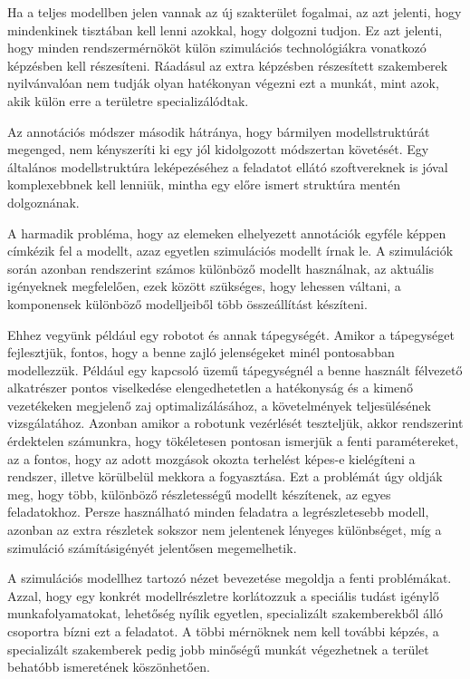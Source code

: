         Ha a teljes modellben jelen vannak az új szakterület fogalmai, az azt jelenti, hogy mindenkinek tisztában kell lenni azokkal, hogy dolgozni tudjon.
        Ez azt jelenti, hogy minden rendszermérnököt külön szimulációs technológiákra vonatkozó képzésben kell részesíteni.
        Ráadásul az extra képzésben részesített szakemberek nyilvánvalóan nem tudják olyan hatékonyan végezni ezt a munkát, mint azok, akik külön erre a területre specializálódtak.

        Az annotációs módszer második hátránya, hogy bármilyen modellstruktúrát megenged, nem kényszeríti ki egy jól kidolgozott módszertan követését.
        Egy általános modellstruktúra leképezéséhez a feladatot ellátó szoftvereknek is jóval komplexebbnek kell lenniük, mintha egy előre ismert struktúra mentén dolgoznának.

        A harmadik probléma, hogy az elemeken elhelyezett annotációk egyféle képpen címkézik fel a modellt, azaz egyetlen szimulációs modellt írnak le.
        A szimulációk során azonban rendszerint számos különböző modellt használnak, az aktuális igényeknek megfelelően, ezek között szükséges, hogy lehessen váltani, a komponensek különböző modelljeiből több összeállítást készíteni.
        
        Ehhez vegyünk például egy robotot és annak tápegységét.
        Amikor a tápegységet fejlesztjük, fontos, hogy a benne zajló jelenségeket minél pontosabban modellezzük. Például egy kapcsoló üzemű tápegységnél a benne használt félvezető alkatrészer pontos viselkedése elengedhetetlen a hatékonyság és a kimenő vezetékeken megjelenő zaj optimalizálásához, a követelmények teljesülésének vizsgálatához.
        Azonban amikor a robotunk vezérlését teszteljük, akkor rendszerint érdektelen számunkra, hogy tökéletesen pontosan ismerjük a fenti paramétereket, az a fontos, hogy az adott mozgások okozta terhelést képes-e kielégíteni a rendszer, illetve körülbelül mekkora a fogyasztása.
        Ezt a problémát úgy oldják meg, hogy több, különböző részletességű modellt készítenek, az egyes feladatokhoz.
        Persze használható minden feladatra a legrészletesebb modell, azonban az extra részletek sokszor nem jelentenek lényeges különbséget, míg a szimuláció számításigényét jelentősen megemelhetik.

        A szimulációs modellhez tartozó nézet bevezetése megoldja a fenti problémákat.
        Azzal, hogy egy konkrét modellrészletre korlátozzuk a speciális tudást igénylő munkafolyamatokat, lehetőség nyílik egyetlen, specializált szakemberekből álló csoportra bízni ezt a feladatot.
        A többi mérnöknek nem kell további képzés, a specializált szakemberek pedig jobb minőségű munkát végezhetnek a terület behatóbb ismeretének köszönhetően.

